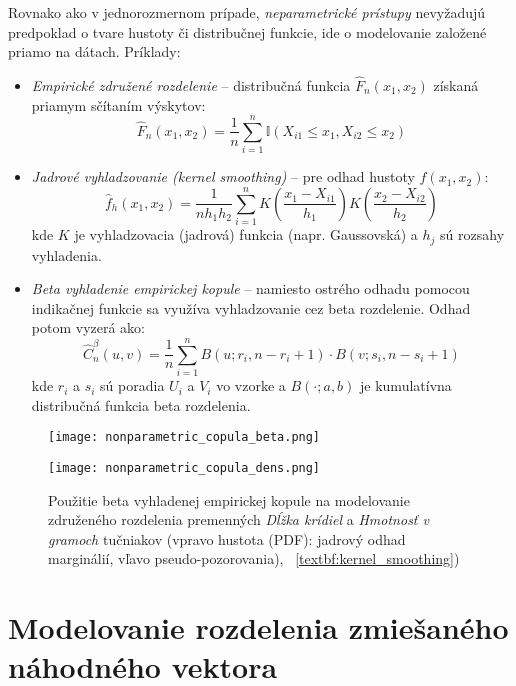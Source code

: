 Rovnako ako v jednorozmernom prípade, \textit{neparametrické prístupy} nevyžadujú predpoklad o tvare hustoty či distribučnej funkcie, ide o modelovanie založené priamo na dátach. Príklady:

\begin{itemize}
  \item \textit{Empirické združené rozdelenie} – distribučná funkcia $\hat{F}_n(x_1, x_2)$ získaná priamym sčítaním výskytov:
  \begin{equation}
  \hat{F}_n(x_1, x_2) = \frac{1}{n} \sum_{i=1}^{n} \mathbb{I}(X_{i1} \leq x_1, X_{i2} \leq x_2)
  \end{equation}
  \item \textit{Jadrové vyhladzovanie (kernel smoothing)} – pre odhad hustoty $f(x_1, x_2)$:
  \begin{equation}
  \hat{f}_h(x_1, x_2) = \frac{1}{n h_1 h_2} \sum_{i=1}^{n} K\left( \frac{x_1 - X_{i1}}{h_1} \right) K\left( \frac{x_2 - X_{i2}}{h_2} \right)
  \end{equation}
  kde $K$ je vyhladzovacia (jadrová) funkcia (napr. Gaussovská) a $h_j$ sú rozsahy vyhladenia.

  \item \textit{Beta vyhladenie empirickej kopule} – namiesto ostrého odhadu pomocou indikačnej funkcie sa využíva vyhladzovanie cez beta rozdelenie. Odhad potom vyzerá ako:
  \begin{equation}
    \hat{C}_n^{\beta}(u, v) = \frac{1}{n} \sum_{i=1}^n B(u; r_i, n - r_i + 1) \cdot B(v; s_i, n - s_i + 1)
  \end{equation}
  kde $r_i$ a $s_i$ sú poradia $U_i$ a $V_i$ vo vzorke a $B(\cdot; a,b)$ je kumulatívna distribučná funkcia beta rozdelenia.
  
\end{itemize}

\begin{figure}[H]
    \centering
    \begin{minipage}[t]{0.48\linewidth}
        \centering
        \texttt{[image: nonparametric\_copula\_beta.png]}
    \end{minipage}
    \hfill
    \begin{minipage}[t]{0.48\linewidth}
        \centering
        \texttt{[image: nonparametric\_copula\_dens.png]}
    \end{minipage}
    \caption{Použitie beta vyhladenej empirickej kopule na modelovanie združeného rozdelenia premenných \textit{Dĺžka krídiel} a \textit{Hmotnosť v gramoch} tučniakov (vpravo hustota (PDF): jadrový odhad marginálií, vľavo pseudo-pozorovania), ~\ref{textbf:kernel_smoothing})}
    \label{fig:empcopula}
\end{figure}


\section{Modelovanie rozdelenia zmiešaného náhodného vektora}\label{sec:joint_mixture_modeling}


